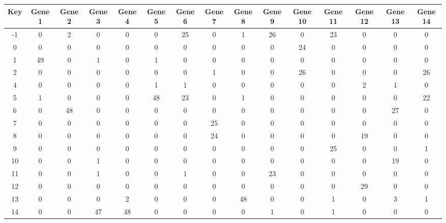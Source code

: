 \begin{tabular}{|c|c|c|c|c|c|c|c|c|c|c|c|c|c|c|}
\hline
Key & Gene 1 & Gene 2 & Gene 3 & Gene 4 & Gene 5 & Gene 6 & Gene 7 & Gene 8 & Gene 9 & Gene 10 & Gene 11 & Gene 12 & Gene 13 & Gene 14 \\
\hline
-1 & 0 & 2 & 0 & 0 & 0 & 25 & 0 & 1 & 26 & 0 & 23 & 0 & 0 & 0 \\
0 & 0 & 0 & 0 & 0 & 0 & 0 & 0 & 0 & 0 & 24 & 0 & 0 & 0 & 0 \\
1 & 49 & 0 & 1 & 0 & 1 & 0 & 0 & 0 & 0 & 0 & 0 & 0 & 0 & 0 \\
2 & 0 & 0 & 0 & 0 & 0 & 0 & 1 & 0 & 0 & 26 & 0 & 0 & 0 & 26 \\
4 & 0 & 0 & 0 & 0 & 1 & 1 & 0 & 0 & 0 & 0 & 0 & 2 & 1 & 0 \\
5 & 1 & 0 & 0 & 0 & 48 & 23 & 0 & 1 & 0 & 0 & 0 & 0 & 0 & 22 \\
6 & 0 & 48 & 0 & 0 & 0 & 0 & 0 & 0 & 0 & 0 & 0 & 0 & 27 & 0 \\
7 & 0 & 0 & 0 & 0 & 0 & 0 & 25 & 0 & 0 & 0 & 0 & 0 & 0 & 0 \\
8 & 0 & 0 & 0 & 0 & 0 & 0 & 24 & 0 & 0 & 0 & 0 & 19 & 0 & 0 \\
9 & 0 & 0 & 0 & 0 & 0 & 0 & 0 & 0 & 0 & 0 & 25 & 0 & 0 & 1 \\
10 & 0 & 0 & 1 & 0 & 0 & 0 & 0 & 0 & 0 & 0 & 0 & 0 & 19 & 0 \\
11 & 0 & 0 & 1 & 0 & 0 & 1 & 0 & 0 & 23 & 0 & 0 & 0 & 0 & 0 \\
12 & 0 & 0 & 0 & 0 & 0 & 0 & 0 & 0 & 0 & 0 & 0 & 29 & 0 & 0 \\
13 & 0 & 0 & 0 & 2 & 0 & 0 & 0 & 48 & 0 & 0 & 1 & 0 & 3 & 1 \\
14 & 0 & 0 & 47 & 48 & 0 & 0 & 0 & 0 & 1 & 0 & 1 & 0 & 0 & 0 \\
\hline
\end{tabular}